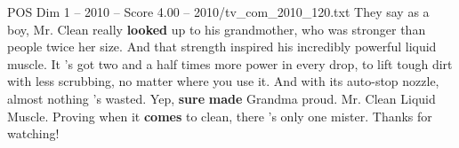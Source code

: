 \begin{textsample}{POS Dim 1 – 2010 – Score 4.00 – 2010/tv\_com\_2010\_120.txt}  \label{ex:f1_pos_064}
They say as a boy, Mr.
Clean really \textbf{looked} up to his grandmother, who was stronger than people twice her size.
And that strength inspired his incredibly powerful liquid muscle.
It 's got two and a half times more power in every drop, to lift tough dirt with less scrubbing, no matter where you use it.
And with its auto-stop nozzle, almost nothing 's wasted.
Yep, \textbf{sure} \textbf{made} Grandma proud.
Mr.
Clean Liquid Muscle.
Proving when it \textbf{comes} to clean, there 's only one mister.
Thanks for watching!

\end{textsample}
